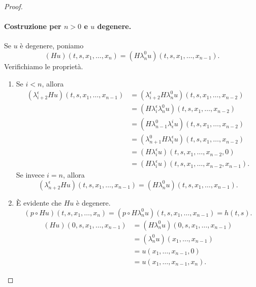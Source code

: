 \begin{proof}
\paragraph{Costruzione per \(n>0\) e \(u\) degenere.}
Se \(u\) è degenere, poniamo
\[
(Hu)(t,s,x_1,\ldots,x_n)=(H\lambda^0_nu)(t,s,x_1,\ldots,x_{n-1}).
\]
Verifichiamo le proprietà.
\begin{enumerate}
\eqitem
\begin{align*}
(\lambda^\epsilon_2Hu)(t,x_1,\ldots,x_n)&=(\lambda^\epsilon_2H\lambda^0_nu)(t,x_1,\ldots,x_{n-1})\\
&=(T_\epsilon\lambda^0_nu)(t,x_1,\ldots,x_{n-1})\\
&=(\lambda^0_{n+1}T_\epsilon u)(t,x_1,\ldots,x_{n-1})\\
&=T_\epsilon u(t,x_1,\ldots,x_{n-1},0)\\
&=T_\epsilon u(t,x_1,\ldots,x_{n-1},x_n).
\end{align*}
\item Se \(i<n\), allora
\begin{align*}
(\lambda^\epsilon_{i+2}Hu)(t,s,x_1,\ldots,x_{n-1})&=(\lambda^\epsilon_{i+2}H\lambda^0_nu)(t,s,x_1,\ldots,x_{n-2})\\
&=(H\lambda^\epsilon_i\lambda^0_nu)(t,s,x_1,\ldots,x_{n-2})\\
&=(H\lambda^0_{n-1}\lambda^i_\epsilon u)(t,s,x_1,\ldots,x_{n-2})\\
&=(\lambda^0_{n+1}H\lambda^\epsilon_iu)(t,s,x_1,\ldots,x_{n-2})\\
&=(H\lambda^\epsilon_iu)(t,s,x_1,\ldots,x_{n-2},0)\\
&=(H\lambda^\epsilon_iu)(t,s,x_1,\ldots,x_{n-2},x_{n-1}).
\end{align*}
Se invece \(i=n\), allora
\[
(\lambda^\epsilon_{n+2}Hu)(t,s,x_1,\ldots,x_{n-1})=(H\lambda^0_nu)(t,s,x_1,\ldots,x_{n-1}).
\]
\item È evidente che \(Hu\) è degenere.
\eqitem
\[
(p\circ Hu)(t,s,x_1,\ldots,x_n)=(p\circ H\lambda^0_nu)(t,s,x_1,\ldots,x_{n-1})=h(t,s).
\]
\eqitem
\begin{align*}
(Hu)(0,s,x_1,\ldots,x_{n-1})&=(H\lambda^0_nu)(0,s,x_1,\ldots,x_{n-1})\\
&=(\lambda^0_nu)(x_1,\ldots,x_{n-1})\\
&=u(x_1,\ldots,x_{n-1},0)\\
&=u(x_1,\ldots,x_{n-1},x_n).
\end{align*}
\end{enumerate}

\end{proof}
